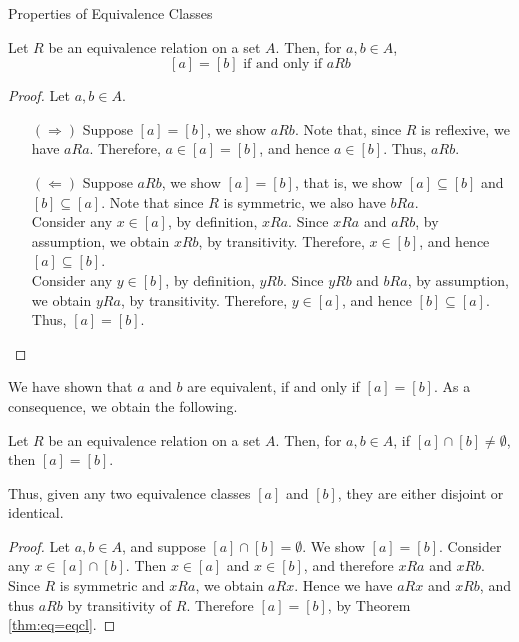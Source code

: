 \vspace*{2em}

\begin{mdframed}
\begin{center}
{\Large Properties of Equivalence Classes}
\end{center}
\end{mdframed}

\begin{theorem}\label{thm:eq=eqcl}
Let $R$ be an equivalence relation on a set $A$. Then, for $a, b \in A$,
\[ [a] = [b] \text{ if and only if } aRb\]
\end{theorem}
\begin{proof}
Let $a,b \in A$.
\begin{itemize}
\item[$(\Rightarrow)$] Suppose $[a] = [b]$, we show $aRb$. Note that, since $R$ is reflexive, we have $aRa$. Therefore, $a \in [a] = [b]$, and hence $a \in [b]$. Thus, $aRb$.

\item[$(\Leftarrow)$] Suppose $aRb$, we show $[a] = [b]$, that is, we show $[a] \subseteq [b]$ and $[b] \subseteq [a]$. Note that since $R$ is symmetric, we also have $bRa$.\\[0.5em]
Consider any $x \in [a]$, by definition, $xRa$. Since $xRa$ and $aRb$, by assumption, we obtain $xRb$, by transitivity. Therefore, $x \in [b]$, and hence $[a] \subseteq [b]$.\\[0.5em]
Consider any $y \in [b]$, by definition, $yRb$. Since $yRb$ and $bRa$, by assumption, we obtain $yRa$, by transitivity. Therefore, $y \in [a]$, and hence $[b] \subseteq [a]$.\\[0.5em]
Thus, $[a] = [b]$.
\end{itemize}
\end{proof}

\vspace*{1em}

We have shown that $a$ and $b$ are equivalent, if and only if $[a] = [b]$. As a consequence, we obtain the following.
\begin{theorem}
Let $R$ be an equivalence relation on a set $A$. Then, for $a, b \in A$, if $[a] \cap [b] \neq \emptyset$, then $[a] = [b]$.
\end{theorem}
Thus, given any two equivalence classes $[a]$ and $[b]$, they are either disjoint or identical.
\begin{proof}
Let $a,b \in A$, and suppose $[a] \cap [b] = \emptyset$. We show $[a] = [b]$. Consider any $x \in [a] \cap [b]$. Then $x \in [a]$ and $x \in [b]$, and therefore $xRa$ and $xRb$. Since $R$ is symmetric and $xRa$, we obtain $aRx$. Hence we have $aRx$ and $xRb$, and thus $aRb$ by transitivity of $R$. Therefore $[a] = [b]$, by Theorem \ref{thm:eq=eqcl}.
\end{proof}

